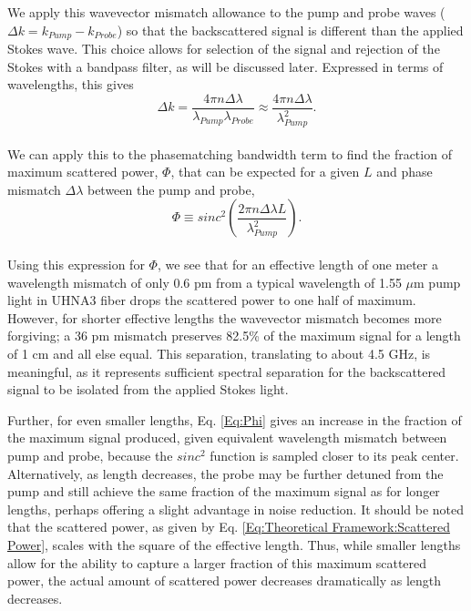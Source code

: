 \documentclass[%
  reprint,
  superscriptaddress,
  amsmath,amssymb,
  aps,
  prapplied,
]{revtex4-2}
\begin{document}
We apply this wavevector mismatch allowance to the pump and probe waves ($\Delta k = k_{Pump} - k_{Probe}$) so that the backscattered signal is different than the applied Stokes wave. This choice allows for selection of the signal and rejection of the Stokes with a bandpass filter, as will be discussed later. Expressed in terms of wavelengths, this gives
\\
\begin{equation}
  \Delta k = \frac{4\pi n\Delta\lambda}{\lambda_{Pump}\lambda_{Probe}} \approx \frac{4\pi n\Delta\lambda}{\lambda_{Pump}^{2}}.
\end{equation}
\\
We can apply this to the phasematching bandwidth term to find the fraction of maximum scattered power, $\Phi$, that can be expected for a given $L$ and phase mismatch $\Delta\lambda$ between the pump and probe,
\\
\begin{equation}
  \Phi \equiv sinc^{2}\left(\frac{2\pi n\Delta\lambda L}{\lambda_{Pump}^{2}}\right).
  \label{Eq:Phi}
\end{equation}
\\
Using this expression for $\Phi$, we see that for an effective length of one meter a wavelength mismatch of only 0.6 pm from a typical wavelength of 1.55 $\mu$m pump light in UHNA3 fiber drops the scattered power to one half of maximum. However, for shorter effective lengths the wavevector mismatch becomes more forgiving; a 36 pm mismatch preserves 82.5\% of the maximum signal for a length of 1 cm and all else equal. This separation, translating to about 4.5 GHz, is meaningful, as it represents sufficient spectral separation for the backscattered signal to be isolated from the applied Stokes light.

Further, for even smaller lengths, Eq. \ref{Eq:Phi} gives an increase in the fraction of the maximum signal produced, given equivalent wavelength mismatch between pump and probe, because the $sinc^{2}$ function is sampled closer to its peak center. Alternatively, as length decreases, the probe may be further detuned from the pump and still achieve the same fraction of the maximum signal as for longer lengths, perhaps offering a slight advantage in noise reduction. It should be noted that the scattered power, as given by Eq. \ref{Eq:Theoretical Framework:Scattered Power}, scales with the square of the effective length. Thus, while smaller lengths allow for the ability to capture a larger fraction of this maximum scattered power, the actual amount of scattered power decreases dramatically as length decreases.
\end{document}
